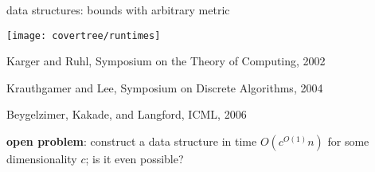 
\begin{frame}[fragile]{data structures: bounds with arbitrary metric}

\begin{center}
\texttt{[image: covertree/runtimes]}
\end{center}

Karger and Ruhl, Symposium on the Theory of Computing, 2002

\vspace{0.15in}
Krauthgamer and Lee, Symposium on Discrete Algorithms, 2004

\vspace{0.15in}
Beygelzimer, Kakade, and Langford, ICML, 2006

\vspace{0.15in}
\textbf{open problem}: construct a data structure in time $O(c^{O(1)}n)$ for some dimensionality $c$; is it even possible?
\vspace{0.15in}

\end{frame}
